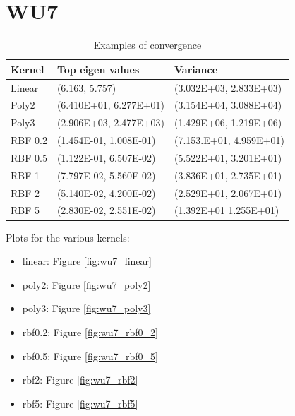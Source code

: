 \section*{WU7}
\begin{table}[here]
	\centering %
	\begin{tabular}{l l l} %
		\hline\hline %
		Kernel & Top eigen values & Variance \\ [0.5ex] %
		\hline %
		Linear & (6.163,   5.757) & (3.032E+03,  2.833E+03) \\ %
		Poly2 & (6.410E+01,  6.277E+01) & (3.154E+04,  3.088E+04) \\
		Poly3 & (2.906E+03,  2.477E+03) & (1.429E+06,  1.219E+06) \\
		RBF 0.2 & (1.454E-01,  1.008E-01) & (7.153.E+01,   4.959E+01) \\
		RBF 0.5 & (1.122E-01,  6.507E-02) & (5.522E+01,  3.201E+01)\\
		RBF 1 & (7.797E-02,  5.560E-02) & (3.836E+01,  2.735E+01)\\
		RBF 2 & (5.140E-02,  4.200E-02) & (2.529E+01,  2.067E+01)\\
		RBF 5 & (2.830E-02,  2.551E-02) & (1.392E+01  1.255E+01) \\ [1ex] %
		\hline %
	\end{tabular}
	\label{table:convergence} %
	\caption{Examples of convergence} %
\end{table}

Plots for the various kernels:
\begin{itemize}
	\item linear: Figure \ref{fig:wu7_linear}
	\item poly2: Figure \ref{fig:wu7_poly2}
	\item poly3: Figure \ref{fig:wu7_poly3}
	\item rbf0.2: Figure \ref{fig:wu7_rbf0_2}
	\item rbf0.5: Figure \ref{fig:wu7_rbf0_5}
	\item rbf2: Figure \ref{fig:wu7_rbf2}
	\item rbf5: Figure \ref{fig:wu7_rbf5}
\end{itemize}


